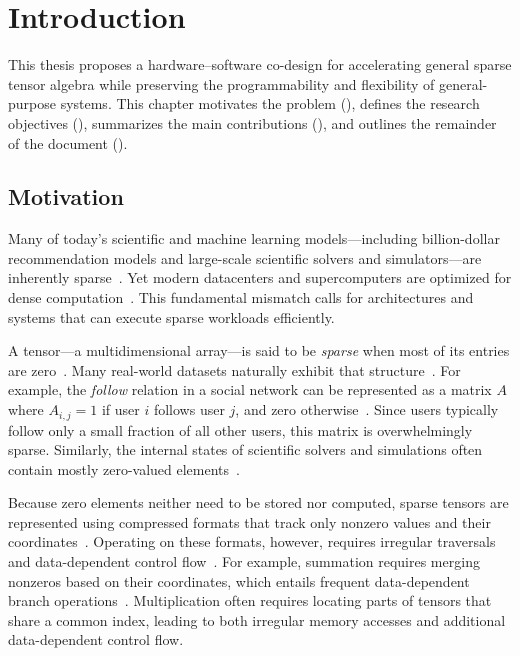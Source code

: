 \chapter{Introduction} \label{sec:introduction}

This thesis proposes a hardware--software co-design for accelerating general sparse tensor algebra while preserving the programmability and flexibility of general-purpose systems. This chapter motivates the problem (), defines the research objectives (), summarizes the main contributions (), and outlines the remainder of the document ().

\section{Motivation} \label{sec:introduction-motivation}

Many of today’s scientific and machine learning models---including billion-dollar recommendation models and large-scale scientific solvers and simulators---are inherently sparse~\cite{gupta2020hpca,gupta2020isca,williams2007sc}. Yet modern datacenters and supercomputers are optimized for dense computation~\cite{nguyen2022ccpe}. This fundamental mismatch calls for architectures and systems that can execute sparse workloads efficiently.

A tensor---a multidimensional array---is said to be \emph{sparse} when most of its entries are zero~\cite{kjolstad2017oopsla}. Many real-world datasets naturally exhibit that structure~\cite{davis2011university}. For example, the \textit{follow} relation in a social network can be represented as a matrix $A$ where $A_{i,j} = 1$ if user $i$ follows user $j$, and zero otherwise~\cite{leskovec2014snap}. Since users typically follow only a small fraction of all other users, this matrix is overwhelmingly sparse. Similarly, the internal states of scientific solvers and simulations often contain mostly zero-valued elements~\cite{barrett1994book,williams2007sc}.

Because zero elements neither need to be stored nor computed, sparse tensors are represented using compressed formats that track only nonzero values and their coordinates~\cite{barrett1994book}. Operating on these formats, however, requires irregular traversals and data-dependent control flow~\cite{sgherzi2024jpdc}. For example, summation requires merging nonzeros based on their coordinates, which entails frequent data-dependent branch operations~\cite{ahrens2023cgo}. Multiplication often requires locating parts of tensors that share a common index, leading to both irregular memory accesses and additional data-dependent control flow.

